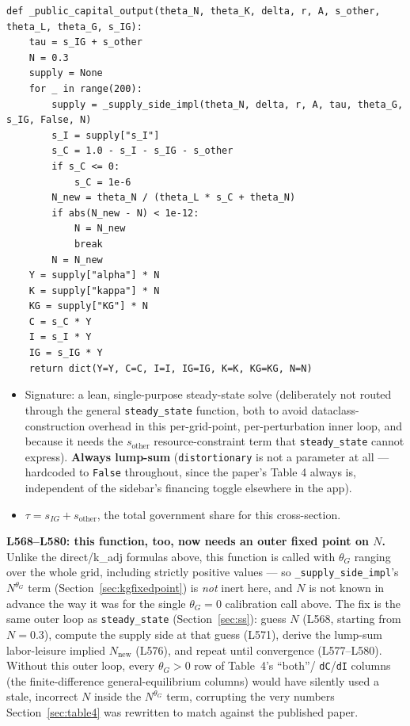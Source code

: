 \documentclass[11pt]{article}
\begin{document}
\begin{lstlisting}[firstnumber=561]
def _public_capital_output(theta_N, theta_K, delta, r, A, s_other, theta_L, theta_G, s_IG):
    tau = s_IG + s_other
    N = 0.3
    supply = None
    for _ in range(200):
        supply = _supply_side_impl(theta_N, delta, r, A, tau, theta_G, s_IG, False, N)
        s_I = supply["s_I"]
        s_C = 1.0 - s_I - s_IG - s_other
        if s_C <= 0:
            s_C = 1e-6
        N_new = theta_N / (theta_L * s_C + theta_N)
        if abs(N_new - N) < 1e-12:
            N = N_new
            break
        N = N_new
    Y = supply["alpha"] * N
    K = supply["kappa"] * N
    KG = supply["KG"] * N
    C = s_C * Y
    I = s_I * Y
    IG = s_IG * Y
    return dict(Y=Y, C=C, I=I, IG=IG, K=K, KG=KG, N=N)
\end{lstlisting}
\begin{itemize}
\item[\textbf{L561}] Signature: a lean, single-purpose steady-state solve
(deliberately not routed through the general \texttt{steady\_state}
function, both to avoid dataclass-construction overhead in this
per-grid-point, per-perturbation inner loop, and because it needs the
$s_{\text{other}}$ resource-constraint term that \texttt{steady\_state}
cannot express). \textbf{Always lump-sum} (\texttt{distortionary} is not a
parameter at all --- hardcoded to \texttt{False} throughout, since the
paper's Table 4 always is, independent of the sidebar's financing toggle
elsewhere in the app).
\item[\textbf{L567}] $\tau=s_{IG}+s_{\text{other}}$, the total government
share for this cross-section.
\end{itemize}

\begin{notebox}
\textbf{L568--L580: this function, too, now needs an outer fixed point on
$N$.} Unlike the direct/k\_adj formulas above, this function is called
with $\theta_G$ ranging over the whole grid, including strictly positive
values --- so \texttt{\_supply\_side\_impl}'s $N^{\theta_G}$ term
(Section~\ref{sec:kgfixedpoint}) is \emph{not} inert here, and $N$ is not
known in advance the way it was for the single $\theta_G=0$ calibration
call above. The fix is the same outer loop as \texttt{steady\_state}
(Section~\ref{sec:ss}): guess $N$ (L568, starting from $N=0.3$), compute
the supply side at that guess (L571), derive the lump-sum labor-leisure
implied $N_{\text{new}}$ (L576), and repeat until convergence (L577--L580).
Without this outer loop, every $\theta_G>0$ row of Table~4's ``both''/
\texttt{dC}/\texttt{dI} columns (the finite-difference general-equilibrium
columns) would have silently used a stale, incorrect $N$ inside the
$N^{\theta_G}$ term, corrupting the very numbers Section~\ref{sec:table4}
was rewritten to match against the published paper.
\end{notebox}
\end{document}
